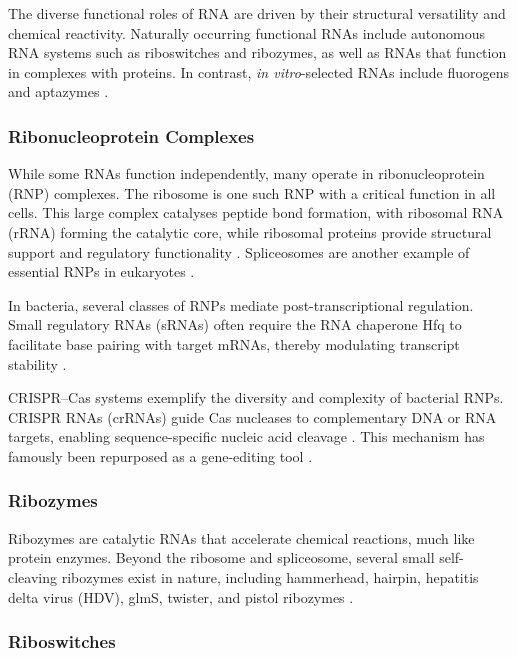 \documentclass{article}
\begin{document}
The diverse functional roles of RNA are driven by their structural versatility and chemical reactivity. 
Naturally occurring functional RNAs include autonomous RNA systems such as riboswitches and ribozymes, as well as RNAs that function in complexes with proteins.
In contrast, \emph{in vitro}-selected RNAs include fluorogens and aptazymes \parencite{Micura2020}.

\subsubsection*{Ribonucleoprotein Complexes}

While some RNAs function independently, many operate in ribonucleoprotein (RNP) complexes.
The ribosome is one such RNP with a critical function in all cells.
This large complex catalyses peptide bond formation, with ribosomal RNA (rRNA) forming the catalytic core, while ribosomal proteins provide structural support and regulatory functionality \parencite{Wahl2009}.
Spliceosomes are another example of essential RNPs in eukaryotes \parencite{Wahl2009}.

In bacteria, several classes of RNPs mediate post-transcriptional regulation.
Small regulatory RNAs (sRNAs) often require the RNA chaperone Hfq to facilitate base pairing with target mRNAs, thereby modulating transcript stability \parencite{Vogel2006}.

CRISPR--Cas systems exemplify the diversity and complexity of bacterial RNPs.
CRISPR RNAs (crRNAs) guide Cas nucleases to complementary DNA or RNA targets, enabling sequence-specific nucleic acid cleavage \parencite{Barrangou2007}.
This mechanism has famously been repurposed as a gene-editing tool \parencite{Jinek2012}.

\subsubsection*{Ribozymes}

Ribozymes are catalytic RNAs that accelerate chemical reactions, much like protein enzymes.
Beyond the ribosome and spliceosome, several small self-cleaving ribozymes exist in nature, including hammerhead, hairpin, hepatitis delta virus (HDV), glmS, twister, and pistol ribozymes \parencite{Roth2014, Weinberg2015, Micura2020}. 

\subsubsection*{Riboswitches}
\end{document}
